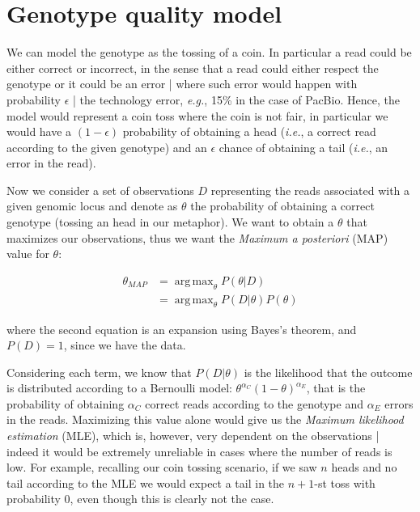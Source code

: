 \documentclass{article}
\DeclareMathOperator*{\argmax}{arg\,max}
\newcommand{\ie}{\textit{i.e.}}
\newcommand{\eg}{\textit{e.g.}}
\begin{document}
\section{Genotype quality model}

We can model the genotype as the tossing of a coin.  In particular a
read could be either correct or incorrect, in the sense that a read
could either respect the genotype or it could be an error | where such
error would happen with probability $\epsilon$ | the technology error,
\eg, 15\% in the case of PacBio.  Hence, the model would represent a
coin toss where the coin is not fair, in particular we would have a
$(1-\epsilon)$ probability of obtaining a head (\ie, a correct read
according to the given genotype) and an $\epsilon$ chance of obtaining
a tail (\ie, an error in the read).
    
Now we consider a set of observations $D$ representing the reads
associated with a given genomic locus and denote as $\theta$ the
probability of obtaining a correct genotype (tossing an head in our
metaphor).  We want to obtain a $\theta$ that maximizes our
observations, thus we want the \emph{Maximum a posteriori} (MAP) value
for $\theta$:

\begin{equation}
  \begin{split}
    \theta_{MAP} &= \argmax_\theta P(\theta | D) \\
    &= \argmax_\theta P(D|\theta)P(\theta)
  \end{split}
\end{equation}

\noindent where the second equation is an expansion using Bayes's
theorem, and $P(D) = 1$, since we have the data.

Considering each term, we know that $P(D|\theta)$ is the likelihood
that the outcome is distributed according to a Bernoulli model:
$\theta^{\alpha_{C}} (1-\theta)^{\alpha_{E}}$, that is the probability
of obtaining $\alpha_{C}$ correct reads according to the genotype and
$\alpha_{E}$ errors in the reads.  Maximizing this value alone would
give us the \emph{Maximum likelihood estimation} (MLE), which is,
however, very dependent on the observations | indeed it would be
extremely unreliable in cases where the number of reads is low.  For
example, recalling our coin tossing scenario, if we saw $n$ heads and
no tail according to the MLE we would expect a tail in the $n+1$-st
toss with probability 0, even though this is clearly not the case.
\end{document}
